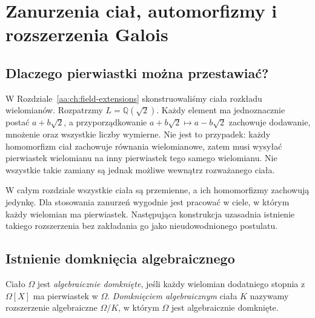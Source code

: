\chapter{Zanurzenia ciał, automorfizmy i rozszerzenia Galois}
\label{aa:ch:embeddings-normal-separable}

\section{Dlaczego pierwiastki można przestawiać?}
W Rozdziale~\ref{aa:ch:field-extensions} skonstruowaliśmy ciała
rozkładu wielomianów. Rozpatrzmy $L=\mathbb Q(\sqrt2)$.
Każdy element ma jednoznacznie postać $a+b\sqrt2$, a przyporządkowanie
$a+b\sqrt2\mapsto a-b\sqrt2$ zachowuje dodawanie, mnożenie oraz
wszystkie liczby wymierne. Nie jest to przypadek: każdy homomorfizm
ciał zachowuje równania wielomianowe, zatem musi wysyłać pierwiastek
wielomianu na inny pierwiastek tego samego wielomianu. Nie wszystkie
takie zamiany są jednak możliwe wewnątrz rozważanego ciała.

W całym rozdziale wszystkie ciała są przemienne, a ich homomorfizmy
zachowują jedynkę. Dla stosowania zanurzeń wygodnie jest pracować
w ciele, w którym każdy wielomian ma pierwiastek. Następująca
konstrukcja uzasadnia istnienie takiego rozszerzenia bez zakładania
go jako nieudowodnionego postulatu.

\section{Istnienie domknięcia algebraicznego}
\begin{definicja}
\label{aa:def:algebraic-closure}
Ciało $\Omega$ jest \emph{algebraicznie domknięte}, jeśli każdy
wielomian dodatniego stopnia z $\Omega[X]$ ma pierwiastek w $\Omega$.
\emph{Domknięciem algebraicznym} ciała $K$ nazywamy rozszerzenie
algebraiczne $\Omega/K$, w którym $\Omega$ jest algebraicznie domknięte.
\end{definicja}


